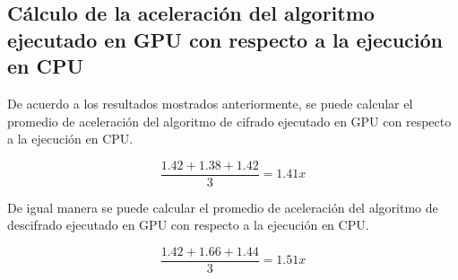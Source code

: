 \documentclass[../main/main.tex]{subfiles}
\begin{document}
    \subsection{Cálculo de la aceleración del algoritmo ejecutado en GPU con respecto a la ejecución en CPU}

        De acuerdo a los resultados mostrados anteriormente, se puede calcular el promedio de aceleración del algoritmo de cifrado ejecutado en GPU con respecto a la ejecución en CPU.

        \vspace{-0.7cm}\begin{equation}
          \frac{1.42 + 1.38 + 1.42}{3} = 1.41x
        \end{equation}

        De igual manera se puede calcular el promedio de aceleración del algoritmo de descifrado ejecutado en GPU con respecto a la ejecución en CPU.

        \vspace{-0.7cm}\begin{equation}
          \frac{1.42 + 1.66 + 1.44}{3} = 1.51x
        \end{equation}
\end{document}
